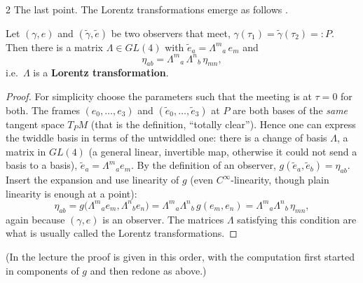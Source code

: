 \begin{paracol}{2}
The last point. The Lorentz transformations emerge as follows .

\begin{theorem}\label{thm:c13-lorentz}
Let $(\gamma,e)$ and $(\tilde\gamma,\tilde e)$ be two observers that meet, $\gamma(\tau_1)=\tilde\gamma(\tau_2)=:P$. Then there is a matrix $\Lambda\in GL(4)$ with $\tilde e_a=\Lambda^m{}_a\,e_m$ and
\[
  \eta_{ab}=\Lambda^m{}_a\,\Lambda^n{}_b\,\eta_{mn},
\]
i.e.\ $\Lambda$ is a \textbf{Lorentz transformation}.
\end{theorem}
\begin{proof}
For simplicity choose the parameters such that the meeting is at $\tau=0$ for both. The frames $(e_0,\dots,e_3)$ and $(\tilde e_0,\dots,\tilde e_3)$ at $P$ are both bases of the \emph{same} tangent space $T_PM$ (that is the definition, ``totally clear''). Hence one can express the twiddle basis in terms of the untwiddled one: there is a change of basis $\Lambda$, a matrix in $GL(4)$ (a general linear, invertible map, otherwise it could not send a basis to a basis), $\tilde e_a=\Lambda^m{}_a e_m$. By the definition of an observer, $g(\tilde e_a,\tilde e_b)=\eta_{ab}$. Insert the expansion and use linearity of $g$ (even $C^\infty$-linearity, though plain linearity is enough at a point):
\[
  \eta_{ab}=g\bigl(\Lambda^m{}_ae_m,\Lambda^n{}_be_n\bigr)=\Lambda^m{}_a\Lambda^n{}_b\,g(e_m,e_n)=\Lambda^m{}_a\Lambda^n{}_b\,\eta_{mn},
\]
again because $(\gamma,e)$ is an observer. The matrices $\Lambda$ satisfying this condition are what is usually called the Lorentz transformations.
\end{proof}
(In the lecture the proof is given in this order, with the computation first started in components of $g$ and then redone as above.)


\end{paracol}
